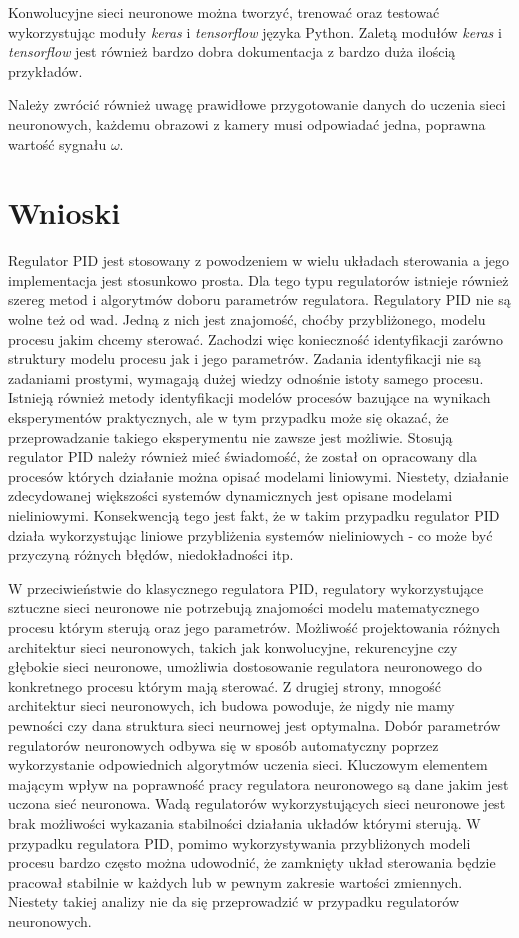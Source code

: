 \documentclass[conference]{IEEEtran}
\begin{document}
Konwolucyjne sieci neuronowe można tworzyć, trenować oraz testować wykorzystując moduły \emph{keras} i \emph{tensorflow} języka Python. Zaletą modułów \emph{keras} i \emph{tensorflow} jest również bardzo dobra dokumentacja z bardzo duża ilością przykładów. 

Należy zwrócić również uwagę prawidłowe przygotowanie danych do uczenia sieci neuronowych, każdemu obrazowi z kamery musi odpowiadać jedna, poprawna wartość sygnału $\omega$.


\section{Wnioski}\label{sec:conclusion}
Regulator PID jest stosowany z powodzeniem w wielu układach sterowania a jego implementacja jest stosunkowo prosta. Dla tego typu regulatorów istnieje również szereg metod i algorytmów doboru parametrów regulatora. Regulatory PID nie są wolne też od wad. Jedną z nich jest znajomość, choćby przybliżonego, modelu procesu jakim chcemy sterować. Zachodzi więc konieczność identyfikacji zarówno struktury modelu procesu jak i jego parametrów. Zadania identyfikacji nie są zadaniami prostymi, wymagają dużej wiedzy odnośnie istoty samego procesu. Istnieją również metody identyfikacji modelów procesów bazujące na wynikach eksperymentów praktycznych, ale w tym przypadku może się okazać, że przeprowadzanie takiego eksperymentu nie zawsze jest możliwie. Stosują regulator PID należy również mieć świadomość, że został on opracowany dla procesów których działanie można opisać modelami liniowymi. Niestety, działanie zdecydowanej większości systemów dynamicznych jest opisane modelami nieliniowymi. Konsekwencją tego jest fakt, że w takim przypadku regulator PID działa wykorzystując liniowe przybliżenia systemów nieliniowych - co może być przyczyną różnych błędów, niedokładności itp.

W przeciwieństwie do klasycznego regulatora PID, regulatory wykorzystujące sztuczne sieci neuronowe nie potrzebują znajomości modelu matematycznego procesu którym sterują oraz jego parametrów. Możliwość projektowania różnych architektur sieci neuronowych, takich jak konwolucyjne, rekurencyjne czy głębokie sieci neuronowe, umożliwia dostosowanie regulatora neuronowego do konkretnego procesu którym mają sterować. Z drugiej strony, mnogość architektur sieci neuronowych, ich budowa powoduje, że nigdy nie mamy pewności czy dana struktura sieci neurnowej jest optymalna.
Dobór parametrów regulatorów neuronowych odbywa się w sposób automatyczny poprzez wykorzystanie odpowiednich algorytmów uczenia sieci.  Kluczowym elementem mającym wpływ na poprawność pracy regulatora neuronowego są dane jakim jest uczona sieć neuronowa. Wadą regulatorów wykorzystujących sieci neuronowe jest brak możliwości wykazania stabilności działania układów którymi sterują. W przypadku regulatora PID, pomimo wykorzystywania przybliżonych modeli procesu bardzo często można udowodnić, że zamknięty układ sterowania będzie pracował stabilnie w każdych lub w pewnym zakresie wartości zmiennych. Niestety takiej analizy nie da się przeprowadzić w przypadku regulatorów neuronowych. 
\end{document}
